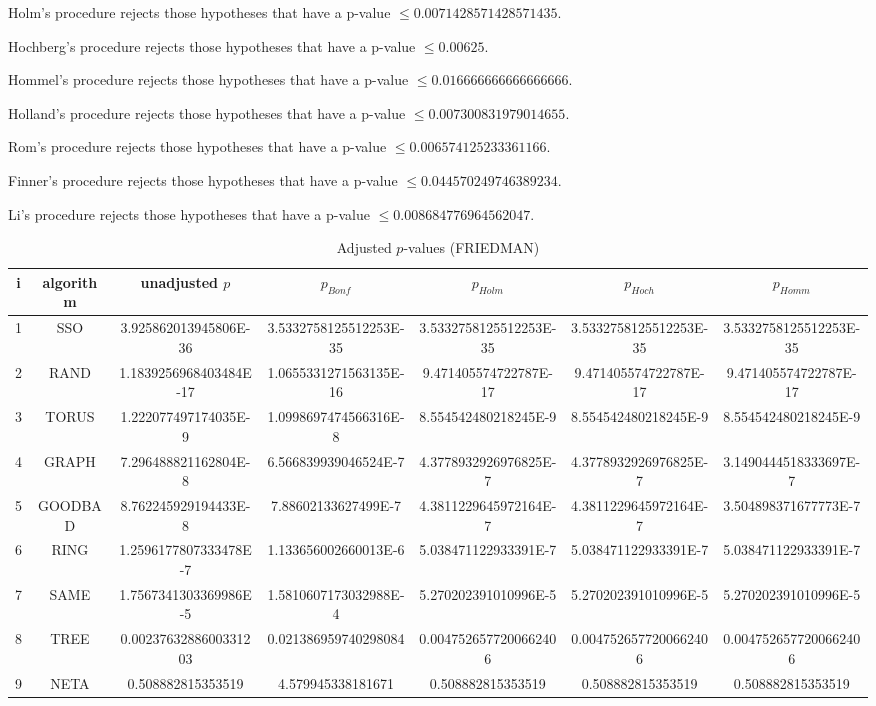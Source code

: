 \documentclass[a4paper,10pt]{article}
\begin{document}
\begin{landscape}
Holm's procedure rejects those hypotheses that have a p-value $\le0.0071428571428571435$.


Hochberg's procedure rejects those hypotheses that have a p-value $\le0.00625$.


Hommel's procedure rejects those hypotheses that have a p-value $\le0.016666666666666666$.


Holland's procedure rejects those hypotheses that have a p-value $\le0.007300831979014655$.


Rom's procedure rejects those hypotheses that have a p-value $\le0.006574125233361166$.


Finner's procedure rejects those hypotheses that have a p-value $\le0.044570249746389234$.


Li's procedure rejects those hypotheses that have a p-value $\le0.008684776964562047$.



\newpage

\begin{table}[!htp]
\centering\scriptsize
\caption{Adjusted $p$-values (FRIEDMAN)}
\begin{tabular}{ccccccc}
i&algorithm&unadjusted $p$&$p_{Bonf}$&$p_{Holm}$&$p_{Hoch}$&$p_{Homm}$\\
\hline
1& SSO&3.925862013945806E-36&3.5332758125512253E-35&3.5332758125512253E-35&3.5332758125512253E-35&3.5332758125512253E-35\\
2& RAND&1.1839256968403484E-17&1.0655331271563135E-16&9.471405574722787E-17&9.471405574722787E-17&9.471405574722787E-17\\
3& TORUS&1.222077497174035E-9&1.0998697474566316E-8&8.554542480218245E-9&8.554542480218245E-9&8.554542480218245E-9\\
4& GRAPH&7.296488821162804E-8&6.566839939046524E-7&4.3778932926976825E-7&4.3778932926976825E-7&3.1490444518333697E-7\\
5& GOODBAD&8.762245929194433E-8&7.88602133627499E-7&4.3811229645972164E-7&4.3811229645972164E-7&3.504898371677773E-7\\
6& RING&1.2596177807333478E-7&1.133656002660013E-6&5.038471122933391E-7&5.038471122933391E-7&5.038471122933391E-7\\
7& SAME&1.7567341303369986E-5&1.5810607173032988E-4&5.270202391010996E-5&5.270202391010996E-5&5.270202391010996E-5\\
8& TREE&0.0023763288600331203&0.021386959740298084&0.0047526577200662406&0.0047526577200662406&0.0047526577200662406\\
9& NETA&0.508882815353519&4.579945338181671&0.508882815353519&0.508882815353519&0.508882815353519\\
\hline
\end{tabular}
\end{table}


\end{landscape}
\end{document}
